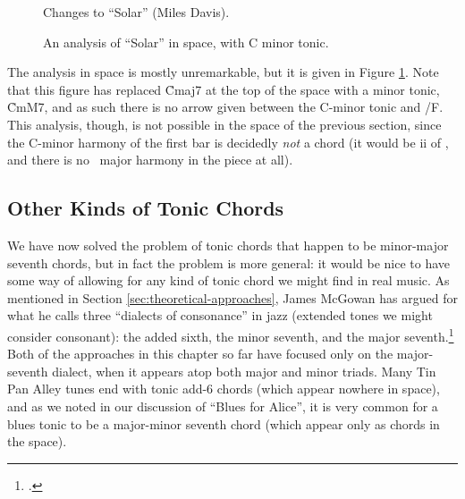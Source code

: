 \begin{figure}[tp]
  \caption{Changes to ``Solar'' (Miles Davis).}
  \label{tfe:solar-changes}

  \vspace{4em}

  \caption{An analysis of ``Solar'' in \tf space, with C minor tonic.}
  \label{tfe:solar-space}
\end{figure}

The analysis in \tf space is mostly unremarkable, but it is given in Figure
\ref{tfe:solar-space}. Note that this figure has replaced \h{Cmaj7} at the top
of the space with a minor tonic, \h{CmM7}, and as such there is no arrow given
between the C-minor tonic and \V/F. This analysis, though, is not
possible in the \tf space of the previous section, since the C-minor harmony
of the first bar is decidedly \emph{not} a \ii chord (it would be ii of
\Bflat, and there is no \Bflat\ major harmony in the piece at all).



\FloatBarrier
\subsection{Other Kinds of Tonic Chords}
\label{sec:other-kinds-tonic}

We have now solved the problem of tonic chords that happen to be minor-major
seventh chords, but in fact the problem is more general: it would be nice to
have some way of allowing for any kind of tonic chord we might find in real
music. As mentioned in Section \ref{sec:theoretical-approaches}, James McGowan
has argued for what he calls three ``dialects of consonance'' in jazz
(extended tones we might consider consonant): the added sixth, the minor
seventh, and the major seventh.\footcite[76--79]{mcgowan:2005} Both of the
approaches in this chapter so far have focused only on the major-seventh
dialect, when it appears atop both major and minor triads. Many Tin Pan Alley
tunes end with tonic add-6 chords (which appear nowhere in \tf space), and as
we noted in our discussion of ``Blues for Alice'', it is very common for a
blues tonic to be a major-minor seventh chord (which appear only as \V chords
in the space).


